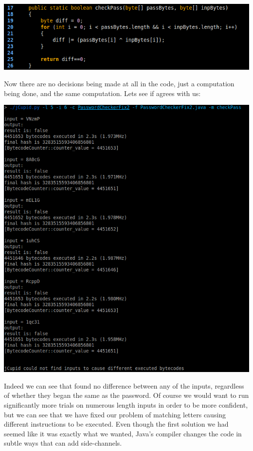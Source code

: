 \begin{center}
  \includegraphics[width=\linewidth]{PasswordCheckerFix2}
\end{center}

Now there are no decisions being made at all in the code, just a computation being done, and the same 
computation. Lets see if \jcupid agrees with us:

\begin{center}
  \includegraphics[width=\linewidth]{jCupidRun3}
\end{center}

Indeed we can see that \jcupid found no difference between any of the inputs, regardless of whether they 
began the same as the password. Of course we would want to run significantly more trials on numerous 
length inputs in order to be more confident, but we can see that we have fixed our problem of matching
letters causing different instructions to be executed. Even though the first solution we had seemed like
it was exactly what we wanted, Java's compiler changes the code in subtle ways that can add side-channels.

